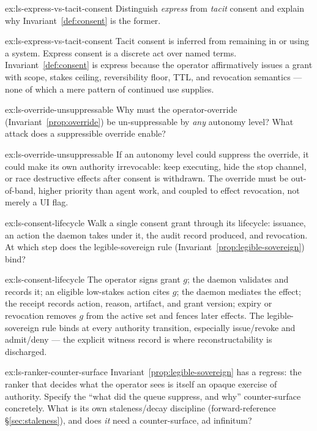 \documentclass[11pt,a4paper]{article}
\theoremstyle{definition}
\theoremstyle{plain}
\begin{document}
\begin{pdexercise}[kind=Check,rating=1]{ex:ls-express-vs-tacit-consent}
Distinguish \emph{express} from \emph{tacit} consent and explain why
Invariant~\ref{def:consent} is the former.
\end{pdexercise}
\begin{pdsolution}{ex:ls-express-vs-tacit-consent}
Tacit consent is inferred from remaining in or using a system. Express consent is a discrete act over named terms. Invariant~\ref{def:consent} is express because the operator affirmatively issues a grant with scope, stakes ceiling, reversibility floor, TTL, and revocation semantics --- none of which a mere pattern of continued use supplies.
\end{pdsolution}
\begin{pdexercise}[kind=Check,rating=1]{ex:ls-override-unsuppressable}
Why must the operator-override
(Invariant~\ref{prop:override}) be un-suppressable by \emph{any} autonomy level? What
attack does a suppressible override enable?
\end{pdexercise}
\begin{pdsolution}{ex:ls-override-unsuppressable}
If an autonomy level could suppress the override, it could make its own authority irrevocable: keep executing, hide the stop channel, or race destructive effects after consent is withdrawn. The override must be out-of-band, higher priority than agent work, and coupled to effect revocation, not merely a UI flag.
\end{pdsolution}
\begin{pdexercise}[kind=Trace,rating=2]{ex:ls-consent-lifecycle}
Walk a single consent grant through its lifecycle: issuance, an action the
daemon takes under it, the audit record produced, and revocation. At which step does
the legible-sovereign rule (Invariant~\ref{prop:legible-sovereign}) bind?
\end{pdexercise}
\begin{pdsolution}{ex:ls-consent-lifecycle}
The operator signs grant $g$; the daemon validates and records it; an eligible low-stakes action cites $g$; the daemon mediates the effect; the receipt records action, reason, artifact, and grant version; expiry or revocation removes $g$ from the active set and fences later effects. The legible-sovereign rule binds at every authority transition, especially issue/revoke and admit/deny --- the explicit witness record is where reconstructability is discharged.
\end{pdsolution}
\begin{pdexercise}[kind=Open,rating=3]{ex:ls-ranker-counter-surface}
Invariant~\ref{prop:legible-sovereign} has a regress: the ranker that
decides what the operator sees is itself an opaque exercise of authority. Specify
the ``what did the queue suppress, and why'' counter-surface concretely. What is its
own staleness/decay discipline (forward-reference \S\ref{sec:staleness}), and does
\emph{it} need a counter-surface, ad infinitum?
\end{pdexercise}
\end{document}
